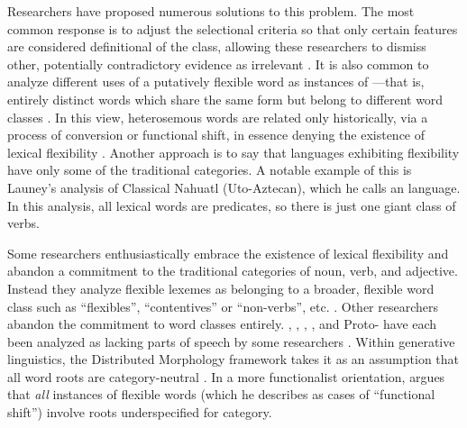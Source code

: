 Researchers have proposed numerous solutions to this problem. The most common response is to adjust the selectional criteria so that only certain features are considered definitional of the class, allowing these researchers to dismiss other, potentially contradictory evidence as irrelevant . It is also common to analyze different uses of a putatively flexible word as instances of —that is, entirely distinct words which share the same form but belong to different word classes \parencite{Lichtenberk1991}. In this view, heterosemous words are related only historically, via a process of conversion or functional shift, in essence denying the existence of lexical flexibility \parencite{EvansOsada2005}. Another approach is to say that languages exhibiting flexibility have only some of the traditional categories. A notable example of this is Launey's \parencites{Launey1994}{Launey2004} analysis of Classical Nahuatl (Uto-Aztecan), which he calls an  language. In this analysis, all lexical words are predicates, so there is just one giant class of verbs.

Some researchers enthusiastically embrace the existence of lexical flexibility and abandon a commitment to the traditional categories of noun, verb, and adjective. Instead they analyze flexible lexemes as belonging to a broader, flexible word class such as \enquote{flexibles}, \enquote{contentives} or \enquote{non-verbs}, etc. \parencites{HengeveldRijkhoff2005}{Luuk2010}. Other researchers abandon the commitment to word classes entirely. , , , , and Proto- have each been analyzed as lacking parts of speech by some researchers . Within generative linguistics, the Distributed Morphology framework takes it as an assumption that all word roots are category-neutral \parencite{Siddiqi2018}. In a more functionalist orientation, \textcite{Farrell2001} argues that \emph{all} instances of flexible words (which he describes as cases of \enquote{functional shift}) involve roots underspecified for category.

